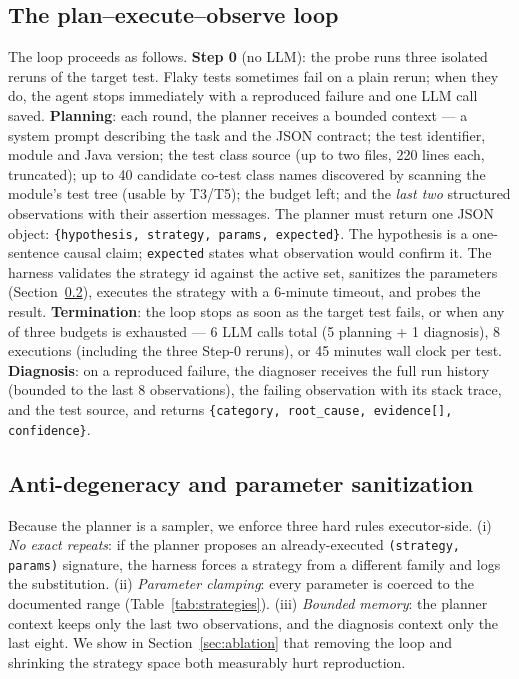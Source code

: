 \subsection{The plan--execute--observe loop}

The loop proceeds as follows. \textbf{Step 0} (no LLM): the probe runs three
isolated reruns of the target test. Flaky tests sometimes fail on a plain
rerun; when they do, the agent stops immediately with a reproduced failure
and one LLM call saved. \textbf{Planning}: each round, the planner receives a
bounded context — a system prompt describing the task and the JSON contract;
the test identifier, module and Java version; the test class source (up to
two files, 220 lines each, truncated); up to 40 candidate co-test class names
discovered by scanning the module's test tree (usable by T3/T5); the budget
left; and the \emph{last two} structured observations with their assertion
messages. The planner must return one JSON object:
\texttt{\{hypothesis, strategy, params, expected\}}. The hypothesis is a
one-sentence causal claim; \texttt{expected} states what observation would
confirm it. The harness validates the strategy id against the active set,
sanitizes the parameters (Section~\ref{sec:antideg}), executes the strategy
with a 6-minute timeout, and probes the result. \textbf{Termination}: the
loop stops as soon as the target test fails, or when any of three budgets is
exhausted — 6 LLM calls total (5 planning + 1 diagnosis), 8 executions
(including the three Step-0 reruns), or 45 minutes wall clock per test.
\textbf{Diagnosis}: on a reproduced failure, the diagnoser receives the full
run history (bounded to the last 8 observations), the failing observation
with its stack trace, and the test source, and returns
\texttt{\{category, root\_cause, evidence[], confidence\}}.

\subsection{Anti-degeneracy and parameter sanitization}
\label{sec:antideg}

Because the planner is a sampler, we enforce three hard rules executor-side.
(i) \emph{No exact repeats}: if the planner proposes an already-executed
\texttt{(strategy, params)} signature, the harness forces a strategy from a
different family and logs the substitution. (ii) \emph{Parameter clamping}:
every parameter is coerced to the documented range
(Table~\ref{tab:strategies}). (iii) \emph{Bounded memory}: the planner context
keeps only the last two observations, and the diagnosis context only the last
eight. We show in Section~\ref{sec:ablation} that removing the loop and
shrinking the strategy space both measurably hurt reproduction.

